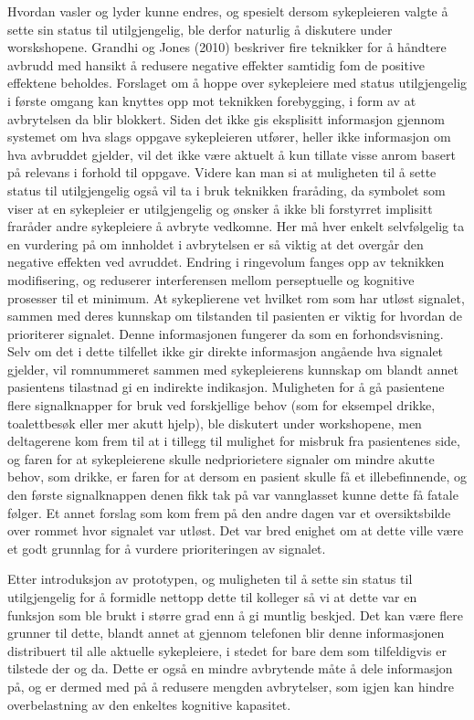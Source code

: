 \noindent
Hvordan vasler og lyder kunne endres, og spesielt dersom sykepleieren valgte å sette sin status til utilgjengelig, ble derfor naturlig å diskutere under worskshopene. Grandhi og Jones (2010) beskriver fire teknikker for å håndtere avbrudd med hansikt å redusere negative effekter samtidig fom de positive effektene beholdes. Forslaget om å hoppe over sykepleiere med status utilgjengelig i første omgang kan knyttes opp mot teknikken forebygging, i form av at avbrytelsen da blir blokkert. Siden det ikke gis eksplisitt informasjon gjennom systemet om hva slags oppgave sykepleieren utfører, heller ikke informasjon om hva avbruddet gjelder, vil det ikke være aktuelt å kun tillate visse anrom basert på relevans i forhold til oppgave. Videre kan man si at muligheten til å sette status til utilgjengelig også vil ta i bruk teknikken fraråding, da symbolet som viser at en sykepleier er utilgjengelig og ønsker å ikke bli forstyrret implisitt fraråder andre sykepleiere å avbryte vedkomne. Her må hver enkelt selvfølgelig ta en vurdering på om innholdet i avbrytelsen er så viktig at det overgår den negative effekten ved avruddet. Endring i ringevolum fanges opp av teknikken modifisering, og reduserer interferensen mellom perseptuelle og kognitive prosesser til et minimum.
At sykeplierene vet hvilket rom som har utløst signalet, sammen med deres kunnskap om tilstanden til pasienten er viktig for hvordan de prioriterer signalet. Denne informasjonen fungerer da som en forhondsvisning. Selv om det i dette tilfellet ikke gir direkte informasjon angående hva signalet gjelder, vil romnummeret sammen med sykepleierens kunnskap om blandt annet pasientens tilastnad gi en indirekte indikasjon. Muligheten for å gå pasientene flere signalknapper for bruk ved forskjellige behov (som for eksempel drikke, toalettbesøk eller mer akutt hjelp), ble diskutert under workshopene, men deltagerene kom frem til at i tillegg til mulighet for misbruk fra pasientenes side, og faren for at sykepleierene skulle nedpriorietere signaler om mindre akutte behov, som drikke, er faren for at dersom en pasient skulle få et illebefinnende, og den første signalknappen denen fikk tak på var vannglasset kunne dette få fatale følger. Et annet forslag som kom frem på den andre dagen var et oversiktsbilde over rommet hvor signalet var utløst. Det var bred enighet om at dette ville være et godt grunnlag for å vurdere prioriteringen av signalet.   

\noindent
Etter introduksjon av prototypen, og muligheten til å sette sin status til utilgjengelig
for å formidle nettopp dette til kolleger så vi at dette var en funksjon som ble brukt
i større grad enn å gi muntlig beskjed. Det kan være flere grunner til dette, blandt annet at gjennom telefonen blir denne informasjonen distribuert til alle aktuelle sykepleiere, i stedet for bare dem som tilfeldigvis er tilstede der og da. Dette er også en mindre avbrytende måte å dele informasjon på, og er dermed med på å redusere mengden avbrytelser, som igjen kan hindre overbelastning av den enkeltes kognitive kapasitet. 

